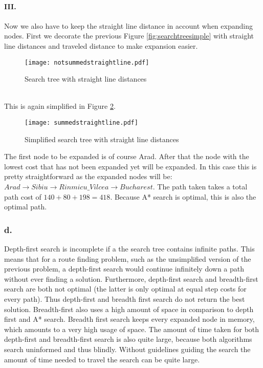 \documentclass[a4paper]{article}
\begin{document}
\paragraph*{III.}
Now we also have to keep the straight line distance in account when expanding nodes. First we decorate the previous Figure \ref{fig:searchtreesimple} with straight line distances and traveled distance to make expansion easier. \\
\begin{figure}[htp]
\centering
\texttt{[image: notsummedstraightline.pdf]}\\
\caption{Search tree with straight line distances}\label{fig:searchtree2}
\end{figure}\\
This is again simplified in Figure \ref{fig:searchtree2simple}.
\begin{figure}[htp]
\centering
\texttt{[image: summedstraightline.pdf]}\\
\caption{Simplified search tree with straight line distances}\label{fig:searchtree2simple}
\end{figure}
The first node to be expanded is of course Arad. After that the node with the lowest cost that has not been expanded yet will be expanded. In this case this is pretty straightforward as the expanded nodes will be: $Arad \rightarrow Sibiu \rightarrow Rinmicu\_Vilcea \rightarrow Bucharest$. The path taken takes a total path cost of $140 + 80 + 198 = 418$. Because A* search is optimal, this is also the optimal path. 

\subsubsection*{d.}
Depth-first search is incomplete if a the search tree contains infinite paths. This means that for a route finding problem, such as the unsimplified version of the previous problem, a depth-first search would continue infinitely down a path without ever finding a solution. Furthermore, depth-first search and breadth-first search are both not optimal (the latter is only optimal at equal step costs for every path). Thus depth-first and breadth first search do not return the best solution. Breadth-first also uses a high amount of space in comparison to depth first and A* search. Breadth first search keeps every expanded node in memory, which amounts to a very high usage of space. The amount of time taken for both depth-first and breadth-first search is also quite large, because both algorithms search uninformed and thus blindly. Without guidelines guiding the search the amount of time needed to travel the search can be quite large.
\end{document}
